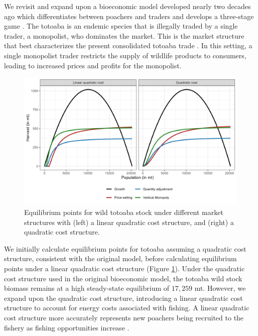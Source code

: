 We revisit and expand upon a bioeconomic model developed nearly two decades ago which differentiates between poachers and traders and develops a three-stage game \citep{bulte_economic_2005, damania_economics_2007}. The totoaba is an endemic species that is illegally traded by a single trader, a monopolist, who dominates the market. This is the market structure that best characterizes the present consolidated totoaba trade \citep{felbab_brown_organized_2022}. In this setting, a single monopolist trader restricts the supply of wildlife products to consumers, leading to increased prices and profits for the monopolist.

\begin{figure}[h]
    \centering
    \includegraphics[width=0.85\linewidth]{figures/totoaba/Figure3.png}
    \caption{Equilibrium points for wild totoaba stock under different market structures with (left) a linear quadratic cost structure, and (right) a quadratic cost structure.}
    \label{fig:figure4}
\end{figure}

We initially calculate equilibrium points for totoaba assuming a quadratic cost structure, consistent with the original model, before calculating equilibrium points under a linear quadratic cost structure (Figure \ref{fig:figure4}). Under the quadratic cost structure used in the original bioeconomic model, the totoaba wild stock biomass remains at a high steady-state equilibrium of $17,259$ mt. However, we expand upon the quadratic cost structure, introducing a linear quadratic cost structure to account for energy costs associated with fishing. A linear quadratic cost structure more accurately represents new poachers being recruited to the fishery as fishing opportunities increase \citep{pereau_triple_2012, clark_worldwide_2007}.


